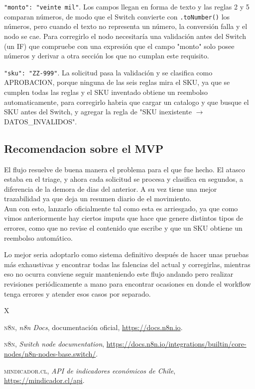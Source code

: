 \texttt{"monto": "veinte mil"}. Los campos llegan en forma de texto y las reglas 2 y 5 comparan números, de modo que el Switch convierte con
\texttt{.toNumber()} los números, pero cuando el texto no representa un número, la conversión falla y el nodo se cae. Para corregirlo el nodo necesitaría una validación antes del Switch (un IF) que compruebe con una expresión que el campo "monto" solo posee números y derivar a otra sección los que no cumplan este requisito. 

\texttt{"sku": "ZZ-999"}. La solicitud pasa la validación y se clasifica como
APROBACION, porque ninguna de las seis reglas mira el SKU, ya que se cumplen todas las reglas y el SKU inventado obtiene un reembolso automaticamente, para corregirlo habria que cargar un catalogo y que busque el SKU antes del Switch, y agregar la regla de "SKU inexistente $\rightarrow$ DATOS\_INVALIDOS". 

\subsection{Recomendacion sobre el MVP}
El flujo resuelve de buena manera el problema para el que fue hecho. El atasco estaba en el triage, y ahora cada solicitud se procesa y clasifica en segundos, a diferencia de la demora de dias del anterior. A su vez tiene una mejor trazabilidad ya que deja un resumen diario de el movimiento.\\ Aun con esto, lanzarlo oficialmente tal como esta es arriesgado, ya que como vimos anteriormente hay ciertos imputs que hace que genere distintos tipos de errores, como que no revise el contenido que escribe y que un SKU obtiene un reembolso automático. 

Lo mejor seria adoptarlo como sistema definitivo después de hacer unas pruebas más exhaustivas y encontrar todas las falencias del actual y corregirlas, mientras eso no ocurra conviene seguir manteniendo este flujo andando pero realizar revisiones periódicamente a mano para encontrar ocasiones en donde el workflow tenga errores y atender esos casos por separado.



\newpage


\begin{thebibliography}{X}

 \textsc{n8n}, \textit{n8n Docs}, documentación oficial,
\url{https://docs.n8n.io}.

 \textsc{n8n}, \textit{Switch node documentation},
\url{https://docs.n8n.io/integrations/builtin/core-nodes/n8n-nodes-base.switch/}.

 \textsc{mindicador.cl}, \textit{API de indicadores económicos de Chile},
\url{https://mindicador.cl/api}.

\end{thebibliography}


